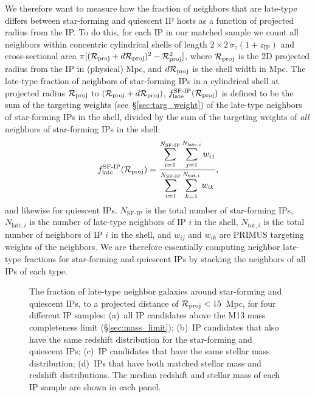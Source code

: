 We therefore want to measure how the fraction of neighbors that are late-type differs 
between star-forming and quiescent IP hosts as a function of projected radius from 
the IP.
To do this, for each IP in our matched sample we count all neighbors within 
concentric cylindrical shells of length ${2\times2\,\sigma_{z}(1+z_{\text{IP}})}$
and cross-sectional area
${\pi[(\mathcal{R}_{\text{proj}}+d\mathcal{R}_{\text{proj}})^2-\mathcal{R}_{\text{proj}}^2]}$, where $\mathcal{R}_{\text{proj}}$ is the 2D projected radius from the IP in (physical) Mpc, and $d\mathcal{R}_{\text{proj}}$ is the shell width in Mpc.
The late-type fraction of neighbors of star-forming IPs in a cylindrical shell 
at projected radius $\mathcal{R}_{\text{proj}}$ to ${(\mathcal{R}_{\text{proj}}+d\mathcal{R}_{\text{proj}})}$, $f^{\textrm{SF-IP}}_{\textrm{late}}
(\mathcal{R}_{\text{proj}})$ is defined to be the sum of the targeting weights (see~\S\ref{sec:targ_weight}) of the late-type neighbors of star-forming IPs in the shell, 
divided by the sum of the
targeting weights of \emph{all} neighbors of star-forming IPs in the shell:
\begin{equation}
        f^{\textrm{SF-IP}}_{\textrm{late}}(\Rproj) = \frac
        {\displaystyle \sum_{i=1}^{N_{\textrm{SF-IP}}} \sum_{j=1}^{N_{\textrm{late},i}} w_{ij} }
        {\displaystyle \sum_{i=1}^{N_{\textrm{SF-IP}}} \sum_{k=1}^{N_{\textrm{tot},i}} w_{ik} }, \nonumber
\end{equation}
and likewise for quiescent IPs.
$N_{\textrm{SF-IP}}$ is the total number of star-forming IPs, $N_{\textrm{late},i}$ is the number of late-type neighbors of IP $i$ in the shell, $N_{\textrm{tot},i}$ is the
total number of neighbors of IP $i$ in the shell, and $w_{ij}$ and $w_{ik}$ are PRIMUS targeting weights of the neighbors.
We are therefore essentially computing neighbor late-type fractions for star-forming 
and quiescent IPs by stacking the neighbors of all IPs of each type.

\begin{figure*}
  \epstrim{0.1in 0.3in 0.4in 0.8in}
  \caption{
The fraction of late-type neighbor galaxies around star-forming 
and quiescent IPs, to a projected distance of ${\mathcal{R}_{\text{proj}}<15}$~Mpc, 
 for four different IP samples: 
(a)~all IP candidates above the M13 mass completeness limit (\S\ref{sec:mass_limit});
(b)~IP candidates that also have the same redshift distribution for the star-forming
and quiescent IPs; 
(c)~IP candidates that have the same stellar mass distribution;
(d)~IPs that have both matched stellar mass and redshift distributions.
The median redshift and stellar mass of each IP sample are shown in each panel.
}
  \label{fig:IPsample_compare}
\end{figure*}


